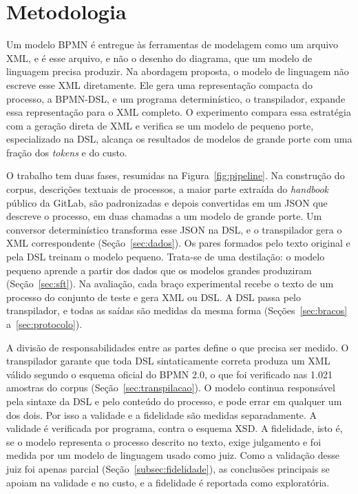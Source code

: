\chapter{Metodologia}\label{cap:metodologia}

Um modelo BPMN é entregue às ferramentas de modelagem como um arquivo XML, e é esse arquivo, e não o desenho do diagrama, que um modelo de linguagem precisa produzir. Na abordagem proposta, o modelo de linguagem não escreve esse XML diretamente. Ele gera uma representação compacta do processo, a BPMN-DSL, e um programa determinístico, o transpilador, expande essa representação para o XML completo. O experimento compara essa estratégia com a geração direta de XML e verifica se um modelo de pequeno porte, especializado na DSL, alcança os resultados de modelos de grande porte com uma fração dos \textit{tokens} e do custo.

O trabalho tem duas fases, resumidas na Figura~\ref{fig:pipeline}. Na construção do corpus, descrições textuais de processos, a maior parte extraída do \textit{handbook} público da GitLab, são padronizadas e depois convertidas em um JSON que descreve o processo, em duas chamadas a um modelo de grande porte. Um conversor determinístico transforma esse JSON na DSL, e o transpilador gera o XML correspondente (Seção~\ref{sec:dados}). Os pares formados pelo texto original e pela DSL treinam o modelo pequeno. Trata-se de uma destilação: o modelo pequeno aprende a partir dos dados que os modelos grandes produziram (Seção~\ref{sec:sft}). Na avaliação, cada braço experimental recebe o texto de um processo do conjunto de teste e gera XML ou DSL. A DSL passa pelo transpilador, e todas as saídas são medidas da mesma forma (Seções~\ref{sec:bracos} a~\ref{sec:protocolo}).



A divisão de responsabilidades entre as partes define o que precisa ser medido. O transpilador garante que toda DSL sintaticamente correta produza um XML válido segundo o esquema oficial do BPMN 2.0, o que foi verificado nas 1.021 amostras do corpus (Seção~\ref{sec:transpilacao}). O modelo continua responsável pela sintaxe da DSL e pelo conteúdo do processo, e pode errar em qualquer um dos dois. Por isso a validade e a fidelidade são medidas separadamente. A validade é verificada por programa, contra o esquema XSD. A fidelidade, isto é, se o modelo representa o processo descrito no texto, exige julgamento e foi medida por um modelo de linguagem usado como juiz. Como a validação desse juiz foi apenas parcial (Seção~\ref{subsec:fidelidade}), as conclusões principais se apoiam na validade e no custo, e a fidelidade é reportada como exploratória.

